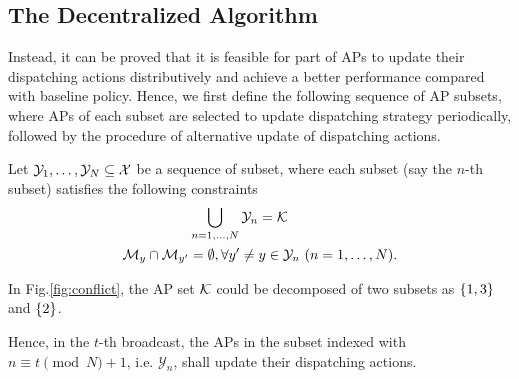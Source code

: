 \subsection{The Decentralized Algorithm}
\label{subsec:ap_alg}
Instead, it can be proved that it is feasible for part of APs to update their dispatching actions distributively and achieve a better performance compared with baseline policy.
Hence, we first define the following sequence of AP subsets, where APs of each subset are selected to update dispatching strategy periodically, followed by the procedure of alternative update of dispatching actions.
\begin{definition}
    Let $\mathcal{Y}_{1}, \dots, \mathcal{Y}_{N} \subseteq \mathcal{X}$ be a sequence of subset, where each subset (say the $n$-th subset) satisfies the following constraints
    \begin{align}
        &\bigcup_{n=1,\dots,N} \mathcal{Y}_{n} = \mathcal{K}
        \\
        \mathcal{M}_{y} \cap \mathcal{M}_{y'} &=\emptyset, \forall y' \neq y \in \mathcal{Y}_{n}~(n=1,\dots,N).
    \end{align}
\end{definition}
\begin{example}
    In Fig.\ref{fig:conflict}, the AP set $\mathcal{K}$ could be decomposed of two subsets as $\{1,3\}$ and $\{2\}$.
\end{example}


Hence, in the $t$-th broadcast, the APs in the subset indexed with $n \equiv t \pmod{N} + 1$, i.e. $\mathcal{Y}_{n}$, shall update their dispatching actions.

